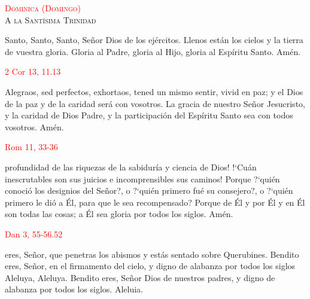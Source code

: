 \documentclass[10pt]{article}
\begin{document}
\begin{multicols}{2}
\begin{otherlanguage}{latin}
            

            \vspace{1mm}

            

            \vspace{1mm}

            
      \end{otherlanguage}


      \begin{center}
            \noindent\textsc{\textcolor{red}{Dominica (Domingo)}\\ {\large A la Santísima Trinidad}}
      \end{center}

      Santo, Santo, Santo, Señor Dios de los ejércitos. Llenos están los cielos y la tierra de vuestra gloria. Gloria al Padre, gloria al Hijo, gloria al Espíritu Santo. Amén.

      \vspace{2mm}

      \hfill\textcolor{red}{2 Cor 13, 11.13}

      Alegraos, sed perfectos, exhortaos, tened un mismo sentir, vivid en paz; y el Dios de la paz y de la caridad será con vosotros. La gracia de nuestro Señor Jesucristo,
      y la caridad de Dios Padre, y la participación del Espíritu Santo sea con todos vosotros. Amén.

      \vspace{2mm}

      \hfill\textcolor{red}{Rom 11, 33-36}

      profundidad de las riquezas de la sabiduría y ciencia de Dios! {!`}Cuán inescrutables son sus juicios e incomprensibles sus caminos! Porque {?`}quién conoció los designios del Señor?,
      o {?`}quién primero fué su consejero?, o {?`}quién primero le dió a Él, para que le sea recompensado? Porque de Él y por Él y en Él son todas las cosas; a Él sea gloria por todos los siglos.
      Amén.

      \vspace{2mm}

      \hfill\textcolor{red}{Dan 3, 55-56.52}

      eres, Señor, que penetras los abismos y estás sentado sobre Querubines. Bendito eres, Señor, en el firmamento del cielo, y digno de alabanza por todos los siglos
      Aleluya, Aleluya. Bendito eres, Señor Dios de nuestros padres, y digno de alabanza por todos los siglos. Aleluia.


\end{multicols}
\end{document}
